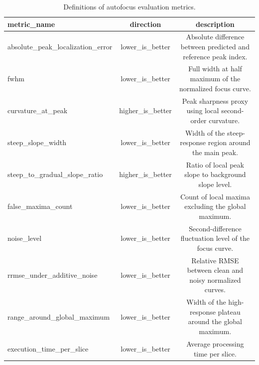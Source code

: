 \begin{table}[t]
\centering
\caption{Definitions of autofocus evaluation metrics.}
\begin{tabular}{lcc}
\hline
metric_name & direction & description \\
\hline
absolute\_peak\_localization\_error & lower\_is\_better & Absolute difference between predicted and reference peak index. \\
fwhm & lower\_is\_better & Full width at half maximum of the normalized focus curve. \\
curvature\_at\_peak & higher\_is\_better & Peak sharpness proxy using local second-order curvature. \\
steep\_slope\_width & lower\_is\_better & Width of the steep-response region around the main peak. \\
steep\_to\_gradual\_slope\_ratio & higher\_is\_better & Ratio of local peak slope to background slope level. \\
false\_maxima\_count & lower\_is\_better & Count of local maxima excluding the global maximum. \\
noise\_level & lower\_is\_better & Second-difference fluctuation level of the focus curve. \\
rrmse\_under\_additive\_noise & lower\_is\_better & Relative RMSE between clean and noisy normalized curves. \\
range\_around\_global\_maximum & lower\_is\_better & Width of the high-response plateau around the global maximum. \\
execution\_time\_per\_slice & lower\_is\_better & Average processing time per slice. \\
\hline
\end{tabular}
\end{table}